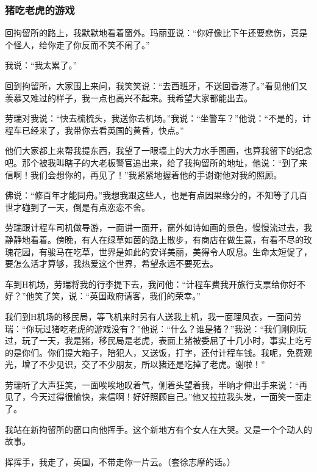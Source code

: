 \subsubsection*{猪吃老虎的游戏}
\par 回拘留所的路上，我默默地看着窗外。玛丽亚说：“你好像比下午还要悲伤，真是个怪人，给你走了你反而不笑不闹了。”
\par 我说：“我太累了。”
\par 回到拘留所，大家围上来问，我笑笑说：“去西班牙，不送回香港了。”看见他们又羡慕又难过的样子，我一点也高兴不起来。我希望大家都能出去。
\par 劳瑞对我说：“快去梳梳头，我送你去机场。”我说：“坐警车？”他说：“不是的，计程车已经来了，我带你去看英国的黄昏，快点。”
\par 他们大家都上来帮我提东西，我望了一眼墙上的大力水手图画，也算我留下的纪念吧。那个被我叫瞎子的大老板警官追出来，给了我拘留所的地址，他说：“到了来信啊！我们会想你的，再见了！”我紧紧地握着他的手谢谢他对我的照顾。
\par 佛说：“修百年才能同舟。”我想我跟这些人，也是有点因果缘分的，不知等了几百世才碰到了一天，倒是有点恋恋不舍。
\par 劳瑞跟计程车司机做导游，一面讲一面开，窗外如诗如画的景色，慢慢流过去，我静静地看着。傍晚，有人在绿草如茵的路上散步，有商店在做生意，有看不尽的玫瑰花园，有骏马在吃草，世界是如此的安详美丽，美得令人叹息。生命太短促了，要怎么活才算够，我热爱这个世界，希望永远不要死去。
\par 车到H机场，劳瑞将我的行李提下去，我问他：“计程车费我开旅行支票给你好不好？”他笑了笑，说：“英国政府请客，我们的荣幸。”
\par 我们到H机场的移民局，等飞机来时另有人送我上机，我一面理风衣，一面问劳瑞：“你玩过猪吃老虎的游戏没有？”他说：“什么？谁是猪？”我说：“我们刚刚玩过，玩了一天，我是猪，移民局是老虎，表面上猪被委屈了十几小时，事实上吃亏的是你们。你们提大箱子，陪犯人，又送饭，打字，还付计程车钱。我呢，免费观光，增了不少见识，交了不少朋友，所以猪还是吃掉了老虎。谢啦！”
\par 劳瑞听了大声狂笑，一面唉唉地叹着气，侧着头望着我，半晌才伸出手来说：“再见了，今天过得很愉快，来信啊！好好照顾自己。”他又拉拉我头发，一面笑一面走了。
\par 我站在新拘留所的窗口向他挥手。这个新地方有个女人在大哭。又是一个个动人的故事。
\par 挥挥手，我走了，英国，不带走你一片云。（套徐志摩的话。）
